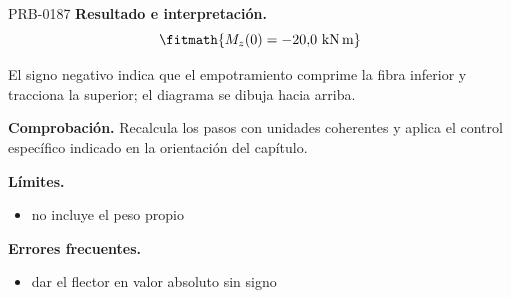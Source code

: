 \begin{studiumworked}{PRB-0187}
\textbf{Resultado e interpretación.}\[\fitmath{M_z(0) = -20{,}0\ \mathrm{kN\,m}}\]

El signo negativo indica que el empotramiento comprime la fibra inferior y tracciona la superior; el diagrama se dibuja hacia arriba.

\par\textbf{Comprobación.} Recalcula los pasos con unidades coherentes y aplica el control específico indicado en la orientación del capítulo.

\textbf{Límites.}\begin{itemize}\item no incluye el peso propio\end{itemize}

\textbf{Errores frecuentes.}\begin{itemize}\item dar el flector en valor absoluto sin signo\end{itemize}

\end{studiumworked}

\Needspace{.3\textheight}

